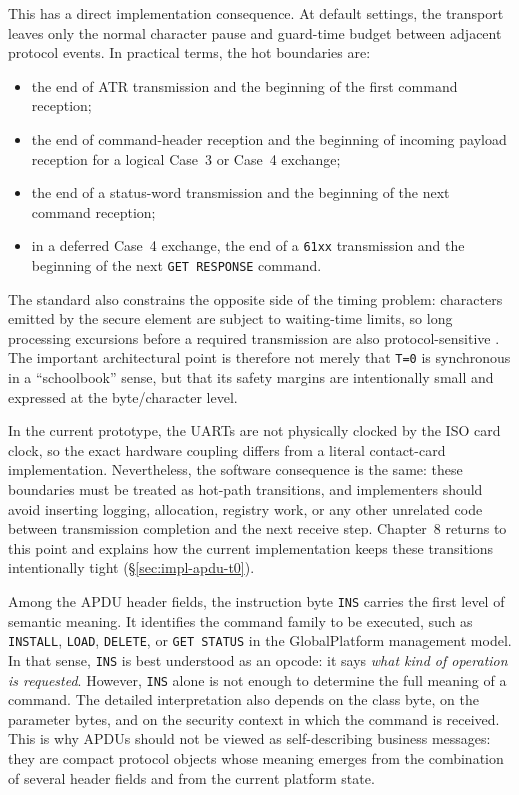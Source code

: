This has a direct implementation consequence. At default settings, the
transport leaves only the normal character pause and guard-time budget
between adjacent protocol events. In practical terms, the hot
boundaries are:

\begin{itemize}
\item the end of ATR transmission and the beginning of the first command
  reception;
\item the end of command-header reception and the beginning of incoming
  payload reception for a logical Case~3 or Case~4 exchange;
\item the end of a status-word transmission and the beginning of the
  next command reception;
\item in a deferred Case~4 exchange, the end of a \texttt{61xx}
  transmission and the beginning of the next \texttt{GET RESPONSE}
  command.
\end{itemize}

The standard also constrains the opposite side of the timing problem:
characters emitted by the secure element are subject to waiting-time limits, so long
processing excursions before a required transmission are also
protocol-sensitive \cite{iso7816-3}. The important architectural point
is therefore not merely that \texttt{T=0} is synchronous in a
``schoolbook'' sense, but that its safety margins are intentionally
small and expressed at the byte/character level.

In the current prototype, the UARTs are not physically clocked by the
ISO card clock, so the exact hardware coupling differs from a literal
contact-card implementation. Nevertheless, the software consequence is
the same: these boundaries must be treated as hot-path transitions, and
implementers should avoid inserting logging, allocation, registry work,
or any other unrelated code between transmission completion and the next
receive step. Chapter~8 returns to this point and explains how the
current implementation keeps these transitions intentionally tight
(\S\ref{sec:impl-apdu-t0}).

Among the APDU header fields, the instruction byte \texttt{INS} carries the
first level of semantic meaning. It identifies the command family to be
executed, such as \texttt{INSTALL}, \texttt{LOAD}, \texttt{DELETE}, or
\texttt{GET STATUS} in the GlobalPlatform management model. In that sense,
\texttt{INS} is best understood as an opcode: it says \emph{what kind of
operation is requested}. However, \texttt{INS} alone is not enough to determine
the full meaning of a command. The detailed interpretation also depends on the
class byte, on the parameter bytes, and on the security context in which the
command is received. This is why APDUs should not be viewed as self-describing
business messages: they are compact protocol objects whose meaning emerges from
the combination of several header fields and from the current platform state.


